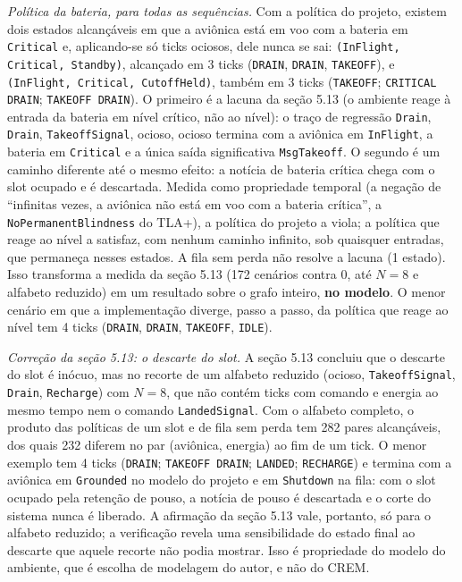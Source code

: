 \documentclass[12pt,a4paper]{article}
\begin{document}
\textit{Política da bateria, para todas as sequências.} Com a política do projeto, existem dois estados alcançáveis em que a aviônica está em voo com a bateria em \texttt{Critical} e, aplicando-se só ticks ociosos, dele nunca se sai: \texttt{(InFlight, Critical, Standby)}, alcançado em 3 ticks (\texttt{DRAIN}, \texttt{DRAIN}, \texttt{TAKEOFF}), e \texttt{(InFlight, Critical, CutoffHeld)}, também em 3 ticks (\texttt{TAKEOFF}; \texttt{CRITICAL DRAIN}; \texttt{TAKEOFF DRAIN}). O primeiro é a lacuna da seção 5.13 (o ambiente reage à entrada da bateria em nível crítico, não ao nível): o traço de regressão \texttt{Drain}, \texttt{Drain}, \texttt{TakeoffSignal}, ocioso, ocioso termina com a aviônica em \texttt{InFlight}, a bateria em \texttt{Critical} e a única saída significativa \texttt{MsgTakeoff}. O segundo é um caminho diferente até o mesmo efeito: a notícia de bateria crítica chega com o slot ocupado e é descartada. Medida como propriedade temporal (a negação de ``infinitas vezes, a aviônica não está em voo com a bateria crítica'', a \texttt{NoPermanentBlindness} do TLA+), a política do projeto a viola; a política que reage ao nível a satisfaz, com nenhum caminho infinito, sob quaisquer entradas, que permaneça nesses estados. A fila sem perda não resolve a lacuna (1 estado). Isso transforma a medida da seção 5.13 (172 cenários contra 0, até $N = 8$ e alfabeto reduzido) em um resultado sobre o grafo inteiro, \textbf{no modelo}. O menor cenário em que a implementação diverge, passo a passo, da política que reage ao nível tem 4 ticks (\texttt{DRAIN}, \texttt{DRAIN}, \texttt{TAKEOFF}, \texttt{IDLE}).

\textit{Correção da seção 5.13: o descarte do slot.} A seção 5.13 concluiu que o descarte do slot é inócuo, mas no recorte de um alfabeto reduzido (ocioso, \texttt{TakeoffSignal}, \texttt{Drain}, \texttt{Recharge}) com $N = 8$, que não contém ticks com comando e energia ao mesmo tempo nem o comando \texttt{LandedSignal}. Com o alfabeto completo, o produto das políticas de um slot e de fila sem perda tem 282 pares alcançáveis, dos quais 232 diferem no par (aviônica, energia) ao fim de um tick. O menor exemplo tem 4 ticks (\texttt{DRAIN}; \texttt{TAKEOFF DRAIN}; \texttt{LANDED}; \texttt{RECHARGE}) e termina com a aviônica em \texttt{Grounded} no modelo do projeto e em \texttt{Shutdown} na fila: com o slot ocupado pela retenção de pouso, a notícia de pouso é descartada e o corte do sistema nunca é liberado. A afirmação da seção 5.13 vale, portanto, só para o alfabeto reduzido; a verificação revela uma sensibilidade do estado final ao descarte que aquele recorte não podia mostrar. Isso é propriedade do modelo do ambiente, que é escolha de modelagem do autor, e não do CREM.
\end{document}
